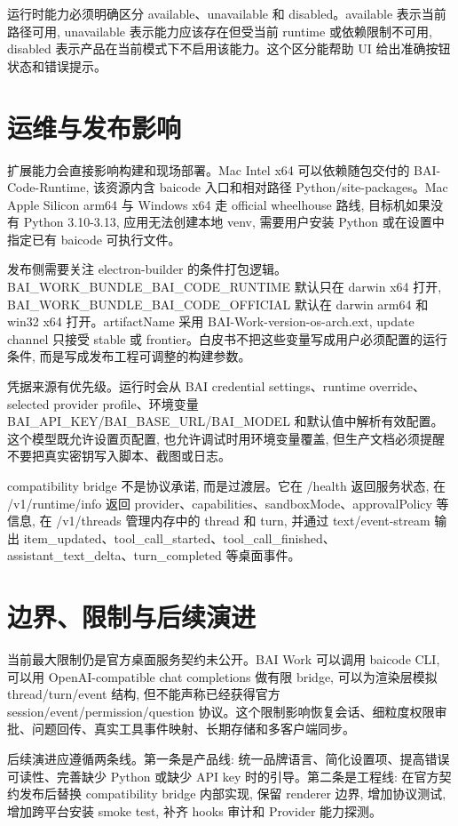 运行时能力必须明确区分 available、unavailable 和 disabled。available 表示当前路径可用, unavailable 表示能力应该存在但受当前 runtime 或依赖限制不可用, disabled 表示产品在当前模式下不启用该能力。这个区分能帮助 UI 给出准确按钮状态和错误提示。

\section{运维与发布影响}
扩展能力会直接影响构建和现场部署。Mac Intel x64 可以依赖随包交付的 BAI-Code-Runtime, 该资源内含 baicode 入口和相对路径 Python/site-packages。Mac Apple Silicon arm64 与 Windows x64 走 official wheelhouse 路线, 目标机如果没有 Python 3.10-3.13, 应用无法创建本地 venv, 需要用户安装 Python 或在设置中指定已有 baicode 可执行文件。

发布侧需要关注 electron-builder 的条件打包逻辑。BAI\_WORK\_BUNDLE\_BAI\_CODE\_RUNTIME 默认只在 darwin x64 打开, BAI\_WORK\_BUNDLE\_BAI\_CODE\_OFFICIAL 默认在 darwin arm64 和 win32 x64 打开。artifactName 采用 BAI-Work-{version}-{os}-{arch}.{ext}, update channel 只接受 stable 或 frontier。白皮书不把这些变量写成用户必须配置的运行条件, 而是写成发布工程可调整的构建参数。

凭据来源有优先级。运行时会从 BAI credential settings、runtime override、selected provider profile、环境变量 BAI\_API\_KEY/BAI\_BASE\_URL/BAI\_MODEL 和默认值中解析有效配置。这个模型既允许设置页配置, 也允许调试时用环境变量覆盖, 但生产文档必须提醒不要把真实密钥写入脚本、截图或日志。

compatibility bridge 不是协议承诺, 而是过渡层。它在 /health 返回服务状态, 在 /v1/runtime/info 返回 provider、capabilities、sandboxMode、approvalPolicy 等信息, 在 /v1/threads 管理内存中的 thread 和 turn, 并通过 text/event-stream 输出 item\_updated、tool\_call\_started、tool\_call\_finished、assistant\_text\_delta、turn\_completed 等桌面事件。

\section{边界、限制与后续演进}
当前最大限制仍是官方桌面服务契约未公开。BAI Work 可以调用 baicode CLI, 可以用 OpenAI-compatible chat completions 做有限 bridge, 可以为渲染层模拟 thread/turn/event 结构, 但不能声称已经获得官方 session/event/permission/question 协议。这个限制影响恢复会话、细粒度权限审批、问题回传、真实工具事件映射、长期存储和多客户端同步。

后续演进应遵循两条线。第一条是产品线: 统一品牌语言、简化设置项、提高错误可读性、完善缺少 Python 或缺少 API key 时的引导。第二条是工程线: 在官方契约发布后替换 compatibility bridge 内部实现, 保留 renderer 边界, 增加协议测试, 增加跨平台安装 smoke test, 补齐 hooks 审计和 Provider 能力探测。

